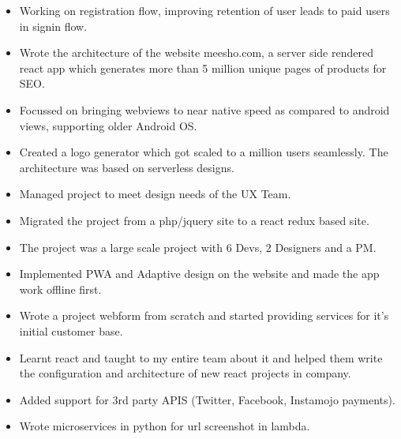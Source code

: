 \documentclass[10pt,a4paper,ragged2e,withhyper]{altacv}
\begin{document}
\begin{paracol}{2}


\begin{itemize}
\item Working on registration flow, improving retention of user leads to paid users in signin flow.
\end{itemize}
\divider


\begin{itemize}
\item Wrote the architecture of the website meesho.com, a server side rendered react app which generates more than 5 million unique pages of products for SEO.
\item Focussed on bringing webviews to near native speed as compared to android views, supporting older Android OS.
\item Created a logo generator which got scaled to a million users seamlessly. The architecture was based on serverless designs.
\end{itemize}

\divider

\begin{itemize}
\item Managed project to meet design needs of the UX Team.
\item Migrated the project from a php/jquery site to a react redux based site.
\item The project was a large scale project with 6 Devs, 2 Designers and a PM.
\item Implemented PWA and Adaptive design on the website and made the app work offline first.
\end{itemize}

\divider


\begin{itemize}
\item Wrote a project webform from scratch and started providing services for it's initial customer base.
\item Learnt react and taught to my entire team about it and helped them write the configuration and architecture of new react projects in company.
\item Added support for 3rd party APIS (Twitter, Facebook, Instamojo payments).
\item Wrote microservices in python for url screenshot in lambda.
\end{itemize}


\end{paracol}
\end{document}
